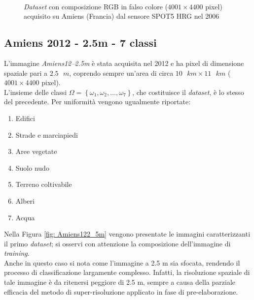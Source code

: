 \clearpage

\begin{figure}[!ht]
   \center
   \\%
     \hspace{4mm}
    \caption{\emph{Dataset} con composizione RGB in falso colore ($4001\times4400$ pixel) acquisito su Amiens (Francia) dal sensore \textsc{SPOT5 HRG} nel 2006}
    \label{fig: Amiens62_5m}
  \end{figure}
\clearpage


\subsection{Amiens 2012 - 2.5m - 7 classi}
L'immagine \emph{Amiens12--2.5m} è stata acquisita nel 2012 e ha pixel di dimensione spaziale pari a $2.5\text{ }m$, coprendo sempre un'area di circa $10\text{ }km\times11\text{ }km$ ($4001\times4400$ pixel).\\
L'insieme delle classi $\Omega=\left\lbrace\omega_1,\omega_2,\ldots,\omega_{7}\right\rbrace$, che costituisce il \emph{dataset}, è lo stesso del precedente. Per uniformità vengono ugualmente riportate:
\begin{enumerate}
\item Edifici
\item Strade e marciapiedi
\item Aree vegetate
\item Suolo nudo
\item Terreno coltivabile
\item Alberi
\item Acqua
\end{enumerate}
Nella Figura \ref{fig: Amiens122_5m} vengono presentate le immagini caratterizzanti il primo \emph{dataset}; si osservi con attenzione la composizione dell'immagine di \emph{training}.\\
Anche in questo caso si nota come l'immagine a 2.5 m sia sfocata, rendendo il processo di classificazione largamente complesso. Infatti, la risoluzione spaziale di tale immagine è da ritenersi peggiore di 2.5 m, sempre a causa della parziale efficacia del metodo di super-risoluzione applicato in fase di pre-elaborazione.

